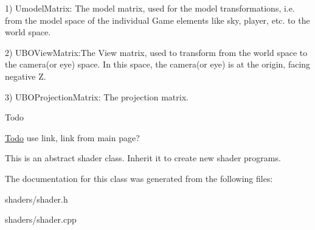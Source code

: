 1) \-Umodel\-Matrix\-: \-The model matrix, used for the model transformations, i.\-e. from the model space of the individual \-Game elements like sky, player, etc. to the world space.

2) \-U\-B\-O\-View\-Matrix\-:\-The \-View matrix, used to transform from the world space to the camera(or eye) space. \-In this space, the camera(or eye) is at the origin, facing negative \-Z.

3) \-U\-B\-O\-Projection\-Matrix\-: \-The projection matrix.

\begin{DoxyRefDesc}{\-Todo}
\item[\hyperlink{todo__todo000001}{\-Todo}]use link, link from main page? \end{DoxyRefDesc}


\-This is an abstract shader class. \-Inherit it to create new shader programs. 

\-The documentation for this class was generated from the following files\-:\begin{DoxyCompactItemize}
\item 
shaders/shader.\-h\item 
shaders/shader.\-cpp\end{DoxyCompactItemize}
